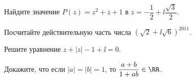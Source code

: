 %
%



\begin{problems}

\item
Найдите значение $P(z) = z^2 + z + 1$ в
$z = - \dfrac{1}{2} + \ii \dfrac{\sqrt{3}}{2}$.

\item
Посчитайте действительную часть числа
$\left(\sqrt{2} + \ii \sqrt{6}\right)^{2011}$.

\item
Решите уравнение
$z + |z| - 1 + \ii = 0$.

\item
Докажите, что если
$|a| = |b| = 1$,
то
$\dfrac{a + b}{1 + a b} \in \RR$.

\end{problems}

